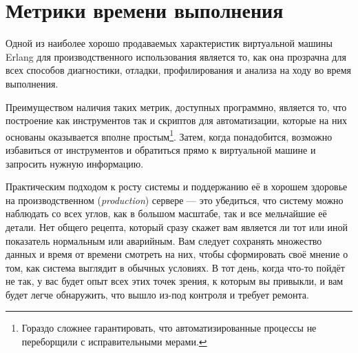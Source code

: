 \chapter{Метрики времени выполнения}
\label{chap:runtime-metrics}

Одной из наиболее хорошо продаваемых характеристик виртуальной машины Erlang для производственного использования является то, как она прозрачна для всех способов диагностики, отладки, профилирования и анализа на ходу во время выполнения.

Преимуществом наличия таких метрик, доступных программно, является то, что построение как инструментов так и скриптов для автоматизации, которые на них основаны оказывается вполне простым\footnote{Гораздо сложнее гарантировать, что автоматизированные процессы не переборщили с исправительными мерами.}. Затем, когда понадобится, возможно избавиться от инструментов и обратиться прямо к виртуальной машине и запросить нужную информацию.

Практическим подходом к росту системы и поддержанию её в хорошем здоровье на производственном (\emph{production}) сервере --- это убедиться, что систему можно наблюдать со всех углов, как в большом масштабе, так и все мельчайшие её детали. Нет общего рецепта, который сразу скажет вам является ли тот или иной показатель нормальным или аварийным. Вам следует сохранять множество данных и время от времени смотреть на них, чтобы сформировать своё мнение о том, как система выглядит в обычных условиях. В тот день, когда что-то пойдёт не так, у вас будет опыт всех этих точек зрения, к которым вы привыкли, и вам будет легче обнаружить, что вышло из-под контроля и требует ремонта.

